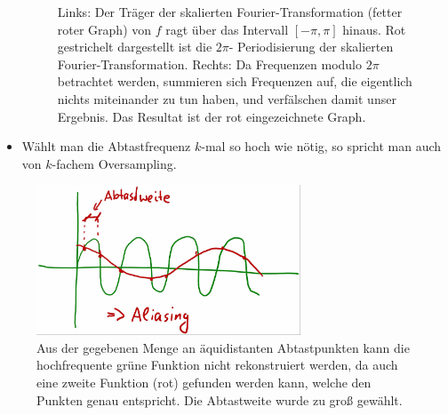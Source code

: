 \begin{remark}
\begin{itemize}
\begin{figure}[ht]
\begin{minipage}{0.49\linewidth}
  \end{minipage}
  \caption{Links: Der Träger der skalierten Fourier-Transformation (fetter roter Graph) von $ f $ 
  ragt über das Intervall $ [-\pi, \pi] $ hinaus. Rot gestrichelt dargestellt ist die $ 2\pi $-
  Periodisierung der skalierten Fourier-Transformation. Rechts: Da Frequenzen modulo $ 2\pi $ 
  betrachtet werden, summieren sich Frequenzen auf, die eigentlich nichts miteinander zu tun haben, 
  und verfälschen damit unser Ergebnis. Das Resultat ist der rot eingezeichnete Graph.}
  \label{fig:shannon}
  \end{figure}
\item Wählt man die Abtastfrequenz $ k $-mal so hoch wie nötig, so spricht man auch von
  $ k $-fachem Oversampling.
\end{itemize}
\end{remark}

\begin{figure}[ht]
	\centering
  \includegraphics[width=0.7\textwidth]{Bilder/Aliasing}
	\caption{Aus der gegebenen Menge an äquidistanten Abtastpunkten kann die hochfrequente 
	grüne Funktion nicht rekonstruiert werden, da auch eine zweite Funktion (rot) gefunden werden 
	kann, welche den Punkten genau entspricht. Die Abtastweite wurde zu groß gewählt.}
	\label{fig:aliasing}
\end{figure}